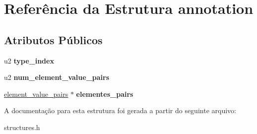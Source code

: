 \hypertarget{structannotation}{}\section{Referência da Estrutura annotation}
\label{structannotation}
\subsection*{Atributos Públicos}
\begin{DoxyCompactItemize}
\item 
\mbox{\label{structannotation_ac1579f92b65639fa8646311a2520e58c}} 
u2 {\bfseries type\+\_\+index}
\item 
\mbox{\label{structannotation_a5f584027263eca714f8ee8fc02fcc2ac}} 
u2 {\bfseries num\+\_\+element\+\_\+value\+\_\+pairs}
\item 
\mbox{\label{structannotation_a4b33f66e2657ea077cec0392e82a0ce5}} 
\hyperlink{structelement__value__pairs}{element\+\_\+value\+\_\+pairs} $\ast$ {\bfseries elementes\+\_\+pairs}
\end{DoxyCompactItemize}


A documentação para esta estrutura foi gerada a partir do seguinte arquivo\+:\begin{DoxyCompactItemize}
\item 
structures.\+h\end{DoxyCompactItemize}
